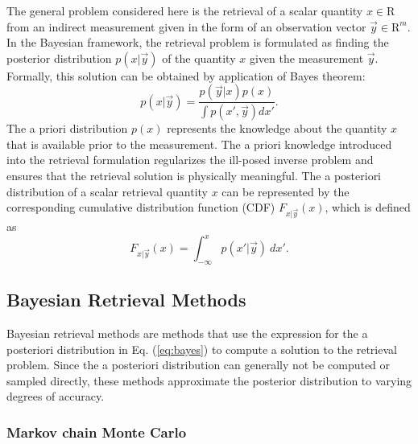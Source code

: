 \documentclass[journal abbreviation, manuscript]{copernicus}
\begin{document}
The general problem considered here is the retrieval of a scalar quantity $x \in
\mathrm{R}$ from an indirect measurement given in the form of an observation
vector $\vec{y} \in \mathrm{R}^m$. In the Bayesian framework, the retrieval
problem is formulated as finding the posterior distribution $p(x | \vec{y})$ of
the quantity $x$ given the measurement $\vec{y}$. Formally, this solution can be
obtained by application of Bayes theorem:
\begin{equation}\label{eq:bayes}
  p(x | \vec{y}) = \frac{p(\vec{y} | x)p(x)}{\int p(x', \vec{y}) dx'}.
\end{equation}
The a priori distribution $p(x)$ represents the knowledge about the quantity $x$
that is available prior to the measurement. The a priori knowledge introduced
into the retrieval formulation regularizes the ill-posed inverse problem and
ensures that the retrieval solution is physically meaningful. The a posteriori
distribution of a scalar retrieval quantity $x$ can be represented by the
corresponding cumulative distribution function (CDF) $F_{x | \vec{y}}(x)$,
which is defined as 
\begin{equation}\label{eq:cdf}
F_{x | \vec{y}}(x) = \int_{-\infty}^{x} p(x' | \vec{y}) \: dx'.
\end{equation}

\subsection{Bayesian Retrieval Methods}

Bayesian retrieval methods are methods that use the expression for the a
posteriori distribution in Eq. (\ref{eq:bayes}) to compute a solution to the
retrieval problem. Since the a posteriori distribution can generally not be
computed or sampled directly, these methods approximate the posterior
distribution to varying degrees of accuracy.

\subsubsection{Markov chain Monte Carlo}
\end{document}
